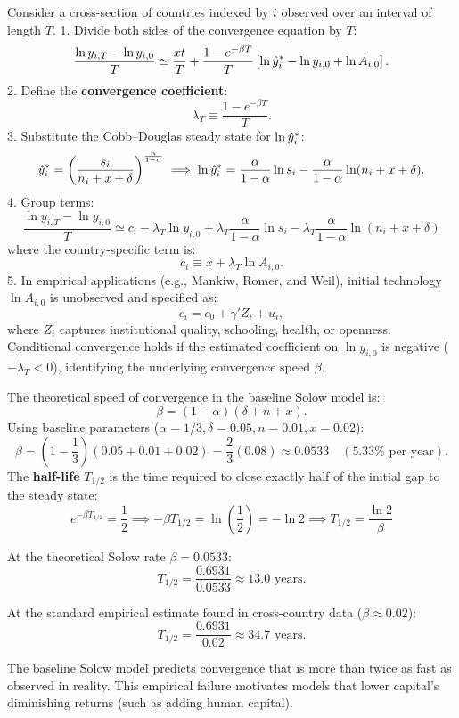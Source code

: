 \documentclass[11pt]{article}
\begin{document}
Consider a cross-section of countries indexed by $i$ observed over an interval of length $T$.
1. Divide both sides of the convergence equation by $T$:
\[
\frac{\ln y_{i,T} - \ln y_{i,0}}{T} \simeq \frac{xt}{T} + \frac{1 - e^{-\beta T}}{T}\left[\ln\hat{y}_i^* - \ln y_{i,0} + \ln A_{i,0}\right].
\]
2. Define the \textbf{convergence coefficient}:
\[
\lambda_T \equiv \frac{1 - e^{-\beta T}}{T}.
\]
3. Substitute the Cobb--Douglas steady state for $\ln\hat{y}_i^*$:
\[
\hat{y}_i^* = \left(\frac{s_i}{n_i + x + \delta}\right)^{\frac{\alpha}{1-\alpha}} \implies \ln\hat{y}_i^* = \frac{\alpha}{1-\alpha}\ln s_i - \frac{\alpha}{1-\alpha}\ln(n_i + x + \delta).
\]
4. Group terms:
\[
\boxed{\frac{\ln y_{i,T} - \ln y_{i,0}}{T} \simeq c_i - \lambda_T \ln y_{i,0} + \lambda_T\frac{\alpha}{1-\alpha}\ln s_i - \lambda_T\frac{\alpha}{1-\alpha}\ln(n_i + x + \delta)}
\]
where the country-specific term is:
\[
c_i \equiv x + \lambda_T \ln A_{i,0}.
\]
5. In empirical applications (e.g., Mankiw, Romer, and Weil), initial technology $\ln A_{i,0}$ is unobserved and specified as:
\[
c_i = c_0 + \gamma' Z_i + u_i,
\]
where $Z_i$ captures institutional quality, schooling, health, or openness. Conditional convergence holds if the estimated coefficient on $\ln y_{i,0}$ is negative ($-\lambda_T < 0$), identifying the underlying convergence speed $\beta$.

The theoretical speed of convergence in the baseline Solow model is:
\[
\beta = (1-\alpha)(\delta + n + x).
\]
Using baseline parameters ($\alpha = 1/3, \delta = 0.05, n = 0.01, x = 0.02$):
\[
\beta = \left(1 - \frac{1}{3}\right)(0.05 + 0.01 + 0.02) = \frac{2}{3}(0.08) \approx 0.0533 \quad (5.33\% \text{ per year}).
\]
The \textbf{half-life} $T_{1/2}$ is the time required to close exactly half of the initial gap to the steady state:
\[
e^{-\beta T_{1/2}} = \frac{1}{2} \implies -\beta T_{1/2} = \ln\left(\frac{1}{2}\right) = -\ln 2 \implies \boxed{T_{1/2} = \frac{\ln 2}{\beta}}
\]
\begin{flatlist}
  \item At the theoretical Solow rate $\beta = 0.0533$:
  \[
  T_{1/2} = \frac{0.6931}{0.0533} \approx 13.0 \text{ years}.
  \]
  \item At the standard empirical estimate found in cross-country data ($\beta \approx 0.02$):
  \[
  T_{1/2} = \frac{0.6931}{0.02} \approx 34.7 \text{ years}.
  \]
\end{flatlist}
 The baseline Solow model predicts convergence that is more than twice as fast as observed in reality. This empirical failure motivates models that lower capital's diminishing returns (such as adding human capital).
\end{document}

